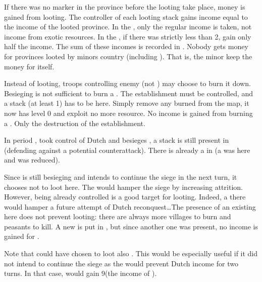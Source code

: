 \bparag If there was no \PILLAGE marker in the province before the looting
take place, money is gained from looting.
\bparag The controller of each looting stack gains income equal to the income
of the looted province.
\bparag In the \ROTW, only the regular income is taken, not income from exotic
resources.
\bparag In the \ROTW, if there was strictly less than 2\LD, gain only half the
income.
\bparag The sum of these incomes is recorded in .
\bparag Nobody gets money for provinces looted by minors country (including
\VASSAL). That is, the minor keep the money for itself.

\aparag[Burning \TP]
\bparag Instead of looting, troops controlling enemy \TP (not \COL) may choose
to burn it down.
\bparag Besieging is not sufficient to burn a \TP. The establishment must be
controlled, and a stack (at least 1\LDE) has to be here.
\bparag Simply remove any burned \TP from the map, it now has level 0 and
exploit no more resource.
\bparag No income is gained from burning a \TP. Only the destruction of the
establishment.

\begin{exemple}[Looting]
  In period , \SPA took control of Dutch \provinceUtrecht and
  besieges \provinceZeeland, a stack is still present in \provinceUtrecht
  (defending against a potential counterattack). There is already a
  \PILLAGE\Facemoins in \provinceUtrecht (a \PILLAGE\Faceplus was here and was
  reduced).

  Since \SPA is still besieging \provinceZeeland and intends to continue the
  siege in the next turn, it chooses not to loot here. The \PILLAGE would
  hamper the siege by increasing attrition. However, \provinceUtrecht being
  already controlled is a good target for looting. Indeed, a \PILLAGE there
  would hamper a future attempt of Dutch reconquest\ldots The presence of an
  existing \PILLAGE here does not prevent looting: there are always more
  villages to burn and peasants to kill. A new \PILLAGE\Faceplus is put in
  \provinceUtrecht, but since another one was present, no income is gained for
  \SPA.

  Note that \SPA could have chosen to loot also \provinceZeeland. This would
  be especially useful if it did not intend to continue the siege as the
  \PILLAGE would prevent Dutch income for two turns. In that case, \SPA would
  gain 9\ducats (the income of \provinceZeeland).
\end{exemple}  

